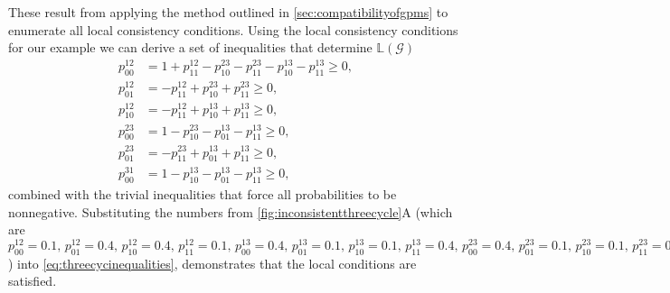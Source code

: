 These result from applying the method outlined in \autoref{sec:compatibilityofgpms} to enumerate all local consistency conditions.
Using the local consistency conditions for our example we can derive a set of inequalities that determine $\mathbb{L}(\mathcal{G})$
\begin{equation}
\begin{aligned}\label{eq:threecycinequalities}
p^{12}_{00} &= 1 + p^{12}_{11} - p^{23}_{10} - p^{23}_{11} - p^{13}_{10} - p^{13}_{11} \geq 0, \\
p^{12}_{01} &= -p^{12}_{11} + p^{23}_{10} + p^{23}_{11} \geq 0,\\
p^{12}_{10} &= -p^{12}_{11} + p^{13}_{10} + p^{13}_{11} \geq 0,\\
p^{23}_{00} &= 1-p^{23}_{10} - p^{13}_{01} - p^{13}_{11} \geq 0,\\
p^{23}_{01} &= -p^{23}_{11} + p^{13}_{01} + p^{13}_{11} \geq 0,\\
p^{31}_{00} &= 1-p^{13}_{10} - p^{13}_{01} - p^{13}_{11} \geq 0,
\end{aligned}
\end{equation}
combined with the trivial inequalities that force all probabilities to be nonnegative. Substituting the numbers from \autoref{fig:inconsistentthreecycle}A (which are $p^{12}_{00} = 0.1,\, p^{12}_{01} = 0.4,\, p^{12}_{10} = 0.4,\,p^{12}_{11} = 0.1,\,p^{13}_{00} = 0.4,\, p^{13}_{01} = 0.1,\, p^{13}_{10} = 0.1,\,p^{13}_{11} = 0.4,\,p^{23}_{00} = 0.4,\, p^{23}_{01} = 0.1,\, p^{23}_{10} = 0.1,\,p^{23}_{11} = 0.4 $) into \autoref{eq:threecycinequalities}, demonstrates that the local conditions are satisfied.

